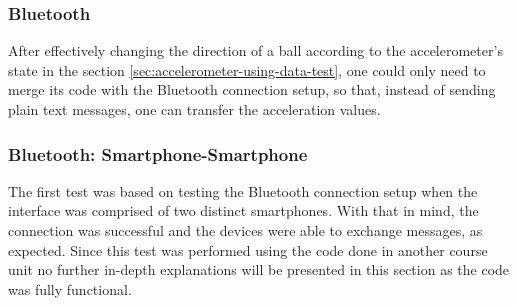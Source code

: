 \subsubsection{Bluetooth}%
\label{sec:bluetooth-test}
After effectively changing the direction of a ball according to the accelerometer's state in the section \ref{sec:accelerometer-using-data-test}, one could only need to merge its code with the Bluetooth connection setup, so that, instead of sending plain text messages, one can transfer the acceleration values.
%
\subsubsection{Bluetooth: Smartphone-Smartphone}%
\label{sec:bluetooth-phone-phone}
%
The first test was based on testing the Bluetooth connection setup when the interface was comprised of two distinct smartphones. With that in mind, the connection was successful and the devices were able to exchange messages, as expected. Since this test was performed using the code done in another course unit no further in-depth explanations will be presented in this section as the code was fully functional.
% 

